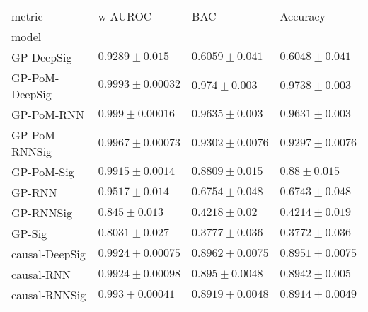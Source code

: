 \begin{tabular}{llll}
\toprule
metric &                                          w-AUROC &                                             BAC &                                        Accuracy \\
model          &                                                  &                                                 &                                                 \\
\midrule
GP-DeepSig     &                             $ 0.9289 \pm 0.015 $ &                            $ 0.6059 \pm 0.041 $ &                            $ 0.6048 \pm 0.041 $ \\
GP-PoM-DeepSig &            $  \underline{ 0.9993 \pm 0.00032 } $ &                 $  \mathbf{ 0.974 \pm 0.003 } $ &                $  \mathbf{ 0.9738 \pm 0.003 } $ \\
GP-PoM-RNN     &                            $ 0.999 \pm 0.00016 $ &                            $ 0.9635 \pm 0.003 $ &                            $ 0.9631 \pm 0.003 $ \\
GP-PoM-RNNSig  &                           $ 0.9967 \pm 0.00073 $ &                           $ 0.9302 \pm 0.0076 $ &                           $ 0.9297 \pm 0.0076 $ \\
GP-PoM-Sig     &                            $ 0.9915 \pm 0.0014 $ &                            $ 0.8809 \pm 0.015 $ &                              $ 0.88 \pm 0.015 $ \\
GP-RNN         &                             $ 0.9517 \pm 0.014 $ &                            $ 0.6754 \pm 0.048 $ &                            $ 0.6743 \pm 0.048 $ \\
GP-RNNSig      &                              $ 0.845 \pm 0.013 $ &                             $ 0.4218 \pm 0.02 $ &                            $ 0.4214 \pm 0.019 $ \\
GP-Sig         &                             $ 0.8031 \pm 0.027 $ &                            $ 0.3777 \pm 0.036 $ &                            $ 0.3772 \pm 0.036 $ \\
causal-DeepSig &                           $ 0.9924 \pm 0.00075 $ &                           $ 0.8962 \pm 0.0075 $ &                           $ 0.8951 \pm 0.0075 $ \\
causal-RNN     &                           $ 0.9924 \pm 0.00098 $ &                            $ 0.895 \pm 0.0048 $ &                            $ 0.8942 \pm 0.005 $ \\
causal-RNNSig  &                            $ 0.993 \pm 0.00041 $ &                           $ 0.8919 \pm 0.0048 $ &                           $ 0.8914 \pm 0.0049 $ \\

\end{tabular}
